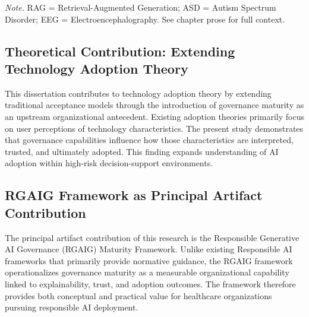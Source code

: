 \vspace{0.3em}\noindent\textit{Note.} RAG = Retrieval-Augmented Generation; ASD = Autism Spectrum Disorder; EEG = Electroencephalography. See chapter prose for full context.
\endgroup



\subsection{Theoretical Contribution: Extending Technology Adoption Theory}
\label{sec:theoretical_contribution_ch5}

\noindent This dissertation contributes to technology adoption theory by extending traditional acceptance models through the introduction of governance maturity as an upstream organizational antecedent. Existing adoption theories primarily focus on user perceptions of technology characteristics. The present study demonstrates that governance capabilities influence how those characteristics are interpreted, trusted, and ultimately adopted. This finding expands understanding of AI adoption within high-risk decision-support environments.


\subsection{RGAIG Framework as Principal Artifact Contribution}
\label{sec:rgaig_principal_artifact}

\noindent The principal artifact contribution of this research is the Responsible Generative AI Governance (RGAIG) Maturity Framework. Unlike existing Responsible AI frameworks that primarily provide normative guidance, the RGAIG framework operationalizes governance maturity as a measurable organizational capability linked to explainability, trust, and adoption outcomes. The framework therefore provides both conceptual and practical value for healthcare organizations pursuing responsible AI deployment.


